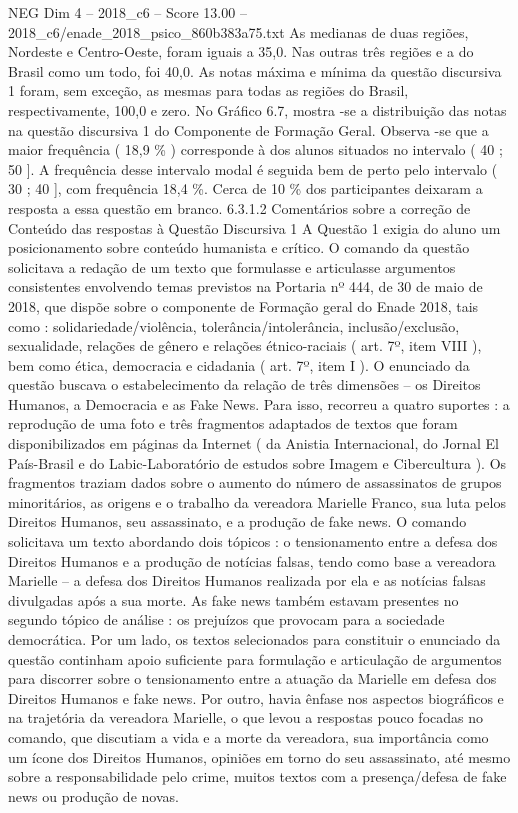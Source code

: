 \begin{textsample}{NEG Dim 4 – 2018\_c6 – Score 13.00 – 2018\_c6/enade\_2018\_psico\_860b383a75.txt}
As medianas de duas regiões, Nordeste e Centro-Oeste, foram iguais a 35,0.
Nas outras três regiões e a do Brasil como um todo, foi 40,0.
As notas máxima e mínima da questão discursiva 1 foram, sem exceção, as mesmas para todas as regiões do Brasil, respectivamente, 100,0 e zero.
No Gráfico 6.7, mostra -se a distribuição das notas na questão discursiva 1 do Componente de Formação Geral.
Observa -se que a maior frequência ( 18,9 \% ) corresponde à dos alunos situados no intervalo ( 40 ; 50 ].
A frequência desse intervalo modal é seguida bem de perto pelo intervalo ( 30 ; 40 ], com frequência 18,4 \%.
Cerca de 10 \% dos participantes deixaram a resposta a essa questão em branco. 6.3.1.2 Comentários sobre a correção de Conteúdo das respostas à Questão Discursiva 1 A Questão 1 exigia do aluno um posicionamento sobre conteúdo humanista e crítico.
O comando da questão solicitava a redação de um texto que formulasse e articulasse argumentos consistentes envolvendo temas previstos na Portaria nº 444, de 30 de maio de 2018, que dispõe sobre o componente de Formação geral do Enade 2018, tais como : solidariedade/violência, tolerância/intolerância, inclusão/exclusão, sexualidade, relações de gênero e relações étnico-raciais ( art. 7º, item VIII ), bem como ética, democracia e cidadania ( art. 7º, item I ).
O enunciado da questão buscava o estabelecimento da relação de três dimensões – os Direitos Humanos, a Democracia e as Fake News.
Para isso, recorreu a quatro suportes : a reprodução de uma foto e três fragmentos adaptados de textos que foram disponibilizados em páginas da Internet ( da Anistia Internacional, do Jornal El País-Brasil e do Labic-Laboratório de estudos sobre Imagem e Cibercultura ).
Os fragmentos traziam dados sobre o aumento do número de assassinatos de grupos minoritários, as origens e o trabalho da vereadora Marielle Franco, sua luta pelos Direitos Humanos, seu assassinato, e a produção de fake news.
O comando solicitava um texto abordando dois tópicos : o tensionamento entre a defesa dos Direitos Humanos e a produção de notícias falsas, tendo como base a vereadora Marielle – a defesa dos Direitos Humanos realizada por ela e as notícias falsas divulgadas após a sua morte.
As fake news também estavam presentes no segundo tópico de análise : os prejuízos que provocam para a sociedade democrática.
Por um lado, os textos selecionados para constituir o enunciado da questão continham apoio suficiente para formulação e articulação de argumentos para discorrer sobre o tensionamento entre a atuação da Marielle em defesa dos Direitos Humanos e fake news.
Por outro, havia ênfase nos aspectos biográficos e na trajetória da vereadora Marielle, o que levou a respostas pouco focadas no comando, que discutiam a vida e a morte da vereadora, sua importância como um ícone dos Direitos Humanos, opiniões em torno do seu assassinato, até mesmo sobre a responsabilidade pelo crime, muitos textos com a presença/defesa de fake news ou produção de novas.

\end{textsample}
